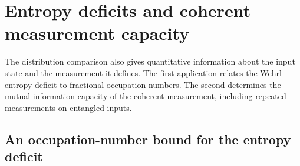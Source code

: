 \section{Entropy deficits and coherent measurement capacity}
\label{app:section}

The distribution comparison also gives quantitative information about
the input state and the measurement it defines.  The first application
relates the Wehrl entropy deficit to fractional occupation numbers.
The second determines the mutual-information capacity of the coherent
measurement, including repeated measurements on entangled inputs.

\subsection{An occupation-number bound for the entropy deficit}

